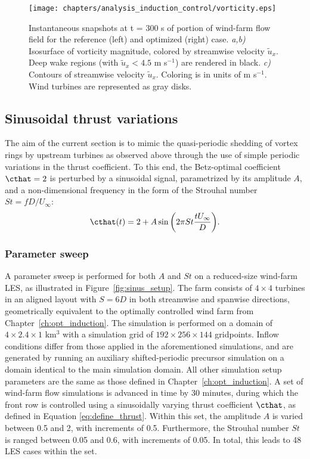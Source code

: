 \begin{figure}
	\centering
	\texttt{[image: chapters/analysis\_induction\_control/vorticity.eps]}
	\caption[Instantaneous snapshots at t = 300 s of portion of wind-farm flow field for the reference and optimized case.]{Instantaneous snapshots at t = 300 s of portion of wind-farm flow field for the reference (left) and optimized (right) case. \emph{a,b) } Isosurface of vorticity magnitude, colored by streamwise velocity $\widetilde{u}_x$. Deep wake regions (with $\widetilde{u}_x < 4.5$ m s$^{-1}$) are rendered in black. \emph{c)} Contours of streamwise velocity $\widetilde{u}_x$. Coloring is in units of m s$^{-1}$. Wind turbines are represented as gray disks. \label{fig:vorticity_windfarm}}
\end{figure}


\subsection{Sinusoidal thrust variations}\label{sec:opt_sinus}
The aim of the current section is to mimic the quasi-periodic shedding of vortex rings by upstream turbines as observed above through the use of simple periodic variations in the thrust coefficient. To this end, the Betz-optimal coefficient $\cthat = 2$ is perturbed by a sinusoidal signal, parametrized by its amplitude $A$, and a non-dimensional frequency in the form of the Strouhal number $St = f D/ U_\infty$:
\begin{equation}
	\cthat(t) = 2 + A \sin \bigg(2\pi St \frac{t U_\infty}{D} \bigg).\label{eq:define_thrust}
\end{equation}

\subsubsection{Parameter sweep}
A parameter sweep is performed for both $A$ and $St$ on a reduced-size wind-farm LES, as illustrated in Figure~\ref{fig:sinus_setup}. The farm consists of $4 \times 4$ turbines in an aligned layout with $S = 6D$ in both streamwise and spanwise directions, geometrically equivalent to the optimally controlled wind farm from Chapter~\ref{ch:opt_induction}. The simulation is performed on a domain of $4 \times 2.4 \times 1$ km$^3$ with a simulation grid of $192 \times 256 \times 144$ gridpoints. Inflow conditions differ from those applied in the aforementioned simulations, and are generated by running an auxiliary shifted-periodic precursor simulation on a domain identical to the main simulation domain. All other simulation setup parameters are the same as those defined in Chapter~\ref{ch:opt_induction}. A set of wind-farm flow simulations is advanced in time by 30 minutes, during which the front row is controlled using a sinusoidally varying thrust coefficient $\cthat$, as defined in Equation \eqref{eq:define_thrust}. Within this set, the amplitude $A$ is varied between 0.5 and 2, with increments of 0.5. Furthermore, the Strouhal number $St$ is ranged between 0.05 and 0.6, with increments of 0.05. In total, this leads to 48 LES cases within the set. 

